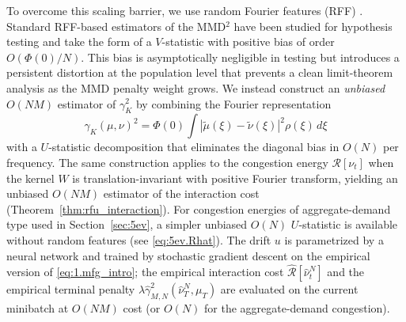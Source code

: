 \documentclass[11pt,leqno]{article}
\theoremstyle{plain}
\theoremstyle{remark}
\theoremstyle{definition}
\numberwithin{equation}{section}
\numberwithin{figure}{section}
\numberwithin{table}{section}
\numberwithin{algorithm}{section}
\begin{document}
To overcome this scaling barrier, we use random Fourier features (RFF) \cite{rah-rec:2007}.
Standard RFF-based estimators of the MMD${}^2$ have been studied for hypothesis testing
\cite{zha-men:2015,sut-sch:2015,cho-kim:2024} and take the form of a $V$-statistic with positive bias of order $O(\Phi(0)/N)$. 
This bias is asymptotically negligible in testing but introduces a persistent distortion at the population level
that prevents a clean limit-theorem analysis as the MMD penalty weight grows.
We instead construct an \emph{unbiased} $O(NM)$ estimator of $\gamma_K^2$
by combining the Fourier representation
\[
 \gamma_K(\mu,\nu)^2 = \Phi(0)\int |\tilde{\mu}(\xi)-\tilde{\nu}(\xi)|^2\rho(\xi)\,d\xi
\]
with a $U$-statistic decomposition that eliminates the diagonal bias in $O(N)$ per frequency.
The same construction applies to the congestion energy $\mathcal{R}[\nu_t]$
when the kernel $W$ is translation-invariant with positive Fourier transform,
yielding an unbiased $O(NM)$ estimator of the interaction cost (Theorem~\ref{thm:rfu_interaction}).
For congestion energies of aggregate-demand type used in Section~\ref{sec:5ev},
a simpler unbiased $O(N)$ $U$-statistic is available without random features
(see \eqref{eq:5ev.Rhat}).
The drift $u$ is parametrized by a neural network and trained by stochastic gradient descent
on the empirical version of \eqref{eq:1.mfg_intro};
the empirical interaction cost $\hat{\mathcal{R}}[\hat\nu_t^N]$ and the empirical terminal penalty
$\lambda\hat\gamma_{M,N}^2(\hat\nu_T^N,\mu_T)$ are evaluated on the current minibatch
at $O(NM)$ cost (or $O(N)$ for the aggregate-demand congestion).
\end{document}
